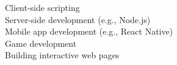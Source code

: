 \documentclass[preview]{standalone}
\begin{document}
Client-side scripting\\Server-side development (e.g., Node.js)\\Mobile app development (e.g., React Native)\\Game development\\Building interactive web pages\\
\end{document}
